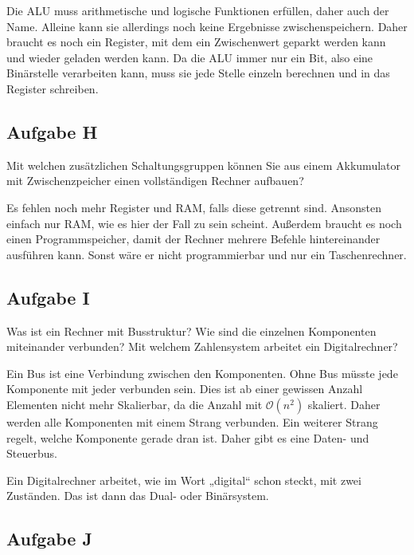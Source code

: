 Die ALU muss arithmetische und logische Funktionen erfüllen, daher auch der
Name. Alleine kann sie allerdings noch keine Ergebnisse zwischenspeichern.
Daher braucht es noch ein Register, mit dem ein Zwischenwert geparkt werden
kann und wieder geladen werden kann. Da die ALU immer nur ein Bit, also eine
Binärstelle verarbeiten kann, muss sie jede Stelle einzeln berechnen und in das
Register schreiben.

\subsection{Aufgabe H}

\begin{problem}
	Mit welchen zusätzlichen Schaltungsgruppen können Sie aus einem
	Akkumulator mit Zwischenzpeicher einen vollständigen Rechner aufbauen?
\end{problem}

Es fehlen noch mehr Register und RAM, falls diese getrennt sind. Ansonsten
einfach nur RAM, wie es hier der Fall zu sein scheint. Außerdem braucht es noch
einen Programmspeicher, damit der Rechner mehrere Befehle hintereinander
ausführen kann. Sonst wäre er nicht programmierbar und nur ein Taschenrechner.

\subsection{Aufgabe I}

\begin{problem}
	Was ist ein Rechner mit Busstruktur? Wie sind die einzelnen Komponenten
	miteinander verbunden? Mit welchem Zahlensystem arbeitet ein
	Digitalrechner?
\end{problem}

Ein Bus ist eine Verbindung zwischen den Komponenten. Ohne Bus müsste jede
Komponente mit jeder verbunden sein. Dies ist ab einer gewissen Anzahl
Elementen nicht mehr Skalierbar, da die Anzahl mit $\mathcal O(n^2)$ skaliert.
Daher werden alle Komponenten mit einem Strang verbunden. Ein weiterer Strang
regelt, welche Komponente gerade dran ist. Daher gibt es eine Daten- und
Steuerbus.

Ein Digitalrechner arbeitet, wie im Wort „digital“ schon steckt, mit zwei
Zuständen. Das ist dann das Dual- oder Binärsystem.

\subsection{Aufgabe J}

